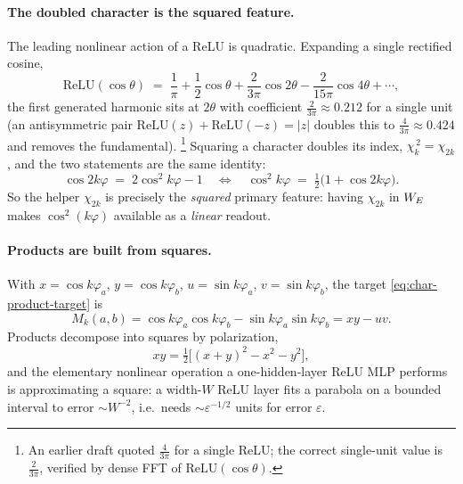 \paragraph{The doubled character is the squared feature.}
The leading nonlinear action of a ReLU is quadratic. Expanding a single
rectified cosine,
\begin{equation}
  \mathrm{ReLU}(\cos\theta)
  \;=\; \frac{1}{\pi} + \frac{1}{2}\cos\theta
       + \frac{2}{3\pi}\cos 2\theta
       - \frac{2}{15\pi}\cos 4\theta + \cdots,
  \label{eq:relu-fourier}
\end{equation}
the first generated harmonic sits at $2\theta$ with coefficient
$\tfrac{2}{3\pi} \approx 0.212$ for a single unit (an antisymmetric pair
$\mathrm{ReLU}(z) + \mathrm{ReLU}(-z) = |z|$ doubles this to
$\tfrac{4}{3\pi} \approx 0.424$ and removes the fundamental).%
\footnote{An earlier draft quoted $\tfrac{4}{3\pi}$ for a single ReLU; the
correct single-unit value is $\tfrac{2}{3\pi}$, verified by dense FFT of
$\mathrm{ReLU}(\cos\theta)$.}
Squaring a character doubles its index, $\chi_k^{\,2} = \chi_{2k}$, and the
two statements are the same identity:
\begin{equation}
  \cos 2k\varphi \;=\; 2\cos^2 k\varphi - 1
  \quad\Longleftrightarrow\quad
  \cos^2 k\varphi \;=\; \tfrac{1}{2}\bigl(1 + \cos 2k\varphi\bigr).
  \label{eq:double-angle}
\end{equation}
So the helper $\chi_{2k}$ is precisely the \emph{squared} primary feature:
having $\chi_{2k}$ in $W_E$ makes $\cos^2(k\varphi)$ available as a
\emph{linear} readout.

\paragraph{Products are built from squares.}
With $x = \cos k\varphi_a$, $y = \cos k\varphi_b$, $u = \sin k\varphi_a$,
$v = \sin k\varphi_b$, the target \eqref{eq:char-product-target} is
\begin{equation}
  M_k(a,b)
  = \cos k\varphi_a \cos k\varphi_b - \sin k\varphi_a \sin k\varphi_b
  = xy - uv.
  \label{eq:product-xy}
\end{equation}
Products decompose into squares by polarization,
\begin{equation}
  xy = \tfrac{1}{2}\bigl[(x+y)^2 - x^2 - y^2\bigr],
  \label{eq:polarization}
\end{equation}
and the elementary nonlinear operation a one-hidden-layer ReLU MLP performs
is approximating a square: a width-$W$ ReLU layer fits a parabola on a
bounded interval to error $\sim W^{-2}$, i.e.\ needs $\sim
\varepsilon^{-1/2}$ units for error $\varepsilon$.

